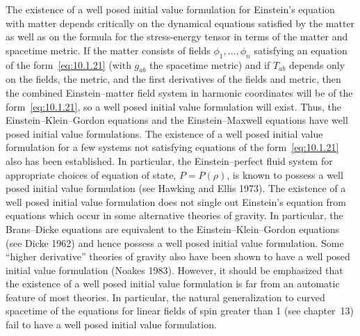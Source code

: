 The existence of a well posed initial value formulation for Einstein's equation with
matter depends critically on the dynamical equations satisfied by the matter as well as
on the formula for the stress-energy tensor in terms of the matter and spacetime metric.
If the matter consists of fields \(\phi_1,\ldots,\phi_n\) satisfying an equation of the
form~\eqref{eq:10.1.21} (with \(g_{ab}\) the spacetime metric) and if \(T_{ab}\)
depends only on the fields, the metric, and the first derivatives of the fields and metric,
then the combined Einstein--matter field system in harmonic coordinates will be of
the form~\eqref{eq:10.1.21}, so a well posed initial value formulation will exist.
Thus, the Einstein--Klein--Gordon equations and the Einstein--Maxwell equations have
well posed initial value formulations. The existence of a well posed initial value
formulation for a few systems not satisfying equations of the
form~\eqref{eq:10.1.21} also has been established. In particular, the Einstein--perfect
fluid system for appropriate choices of equation of state, \(P=P(\rho)\), is known to
possess a well posed initial value formulation (see Hawking and Ellis 1973). The
existence of a well posed initial value formulation does not single out Einstein's
equation from equations which occur in some alternative theories of gravity. In
particular, the Brans--Dicke equations are equivalent to the Einstein--Klein--Gordon
equations (see Dicke 1962) and hence possess a well posed initial value formulation.
Some ``higher derivative'' theories of gravity also have been shown to have a well
posed initial value formulation (Noakes 1983). However, it should be emphasized that
the existence of a well posed initial value formulation is far from an automatic feature
of most theories. In particular, the natural generalization to curved spacetime of the
equations for linear fields of spin greater than 1 (see chapter~13) fail to have a well
posed initial value formulation.

